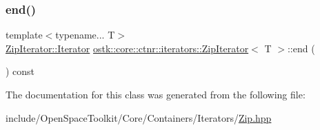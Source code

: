 \mbox{\label{classostk_1_1core_1_1ctnr_1_1iterators_1_1_zip_iterator_a470a84ee17b1e6ac0a92602cb97fca1a}} 
\subsubsection{\texorpdfstring{end()}{end()}}
{\footnotesize\ttfamily template$<$typename... T$>$ \\
\hyperlink{classostk_1_1core_1_1ctnr_1_1iterators_1_1_zip_iterator_1_1_iterator}{Zip\+Iterator\+::\+Iterator} \hyperlink{classostk_1_1core_1_1ctnr_1_1iterators_1_1_zip_iterator}{ostk\+::core\+::ctnr\+::iterators\+::\+Zip\+Iterator}$<$ T $>$\+::end (\begin{DoxyParamCaption}{ }\end{DoxyParamCaption}) const\hspace{0.3cm}{\ttfamily [inline]}}



The documentation for this class was generated from the following file\+:\begin{DoxyCompactItemize}
\item 
include/\+Open\+Space\+Toolkit/\+Core/\+Containers/\+Iterators/\hyperlink{_zip_8hpp}{Zip.\+hpp}\end{DoxyCompactItemize}
